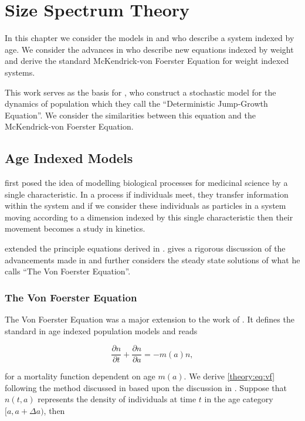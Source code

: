 \documentclass[../main.tex]{subfiles}
\begin{document}
  \chapter{Size Spectrum Theory}\label{chapter:sizetheory}

  In this chapter we consider the models in \cite{mckendrick1926} and \cite{foerster1959} who describe a system indexed by age. We consider the advances in \cite{silvert1978} who describe new equations indexed by weight and derive the standard McKendrick-von Foerster Equation for weight indexed systems.

  This work serves as the basis for \cite{datta2010}, who construct a stochastic model for the dynamics of population which they call the ``Deterministic Jump-Growth Equation''. We consider the similarities between this equation and the McKendrick-von Foerster Equation.

  \section{Age Indexed Models}
  \cite{mckendrick1926} first posed the idea of modelling biological processes for medicinal science by a single characteristic. In a process if individuals meet, they transfer information within the system and if we consider these individuals as particles in a system moving according to a dimension indexed by this single characteristic then their movement becomes a study in kinetics.

  \cite{foerster1959} extended the principle equations derived in \cite{mckendrick1926}. \cite{trucco1965} gives a rigorous discussion of the advancements made in \cite{foerster1959} and further considers the steady state solutions of what he calls ``The Von Foerster Equation''.

  \subsection{The Von Foerster Equation}
  The Von Foerster Equation was a major extension to the work of \cite{mckendrick1926}. It defines the standard in age indexed population models and reads

  \begin{equation}\label{theory:eq:vf}
    \frac{\partial n}{\partial t} + \frac{\partial n}{\partial a} = - m(a)n,
  \end{equation}

  for a mortality function dependent on age $m(a)$. We derive \autoref{theory:eq:vf} following the method discussed in \cite{trucco1965} based upon the discussion in \cite{foerster1959}. Suppose that $n(t, a)$ represents the density of individuals at time $t$ in the age category $[a, a + \Delta a)$, then
\end{document}
